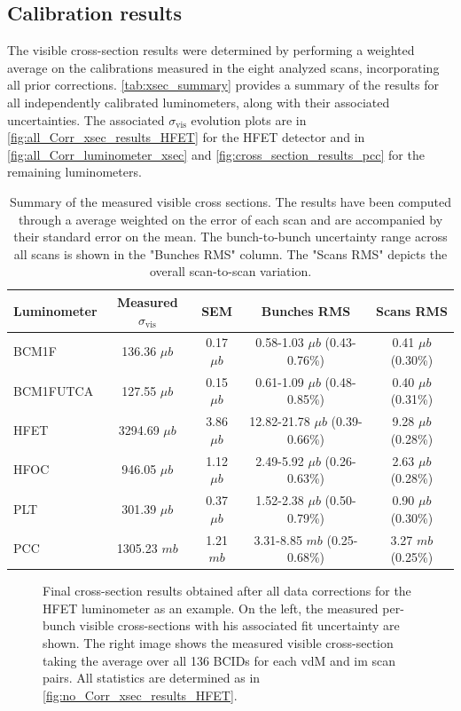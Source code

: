 \subsection{Calibration results}

The visible cross-section results were determined by performing a weighted average on the calibrations measured in the eight analyzed scans, incorporating all prior corrections. \autoref{tab:xsec_summary} provides a summary of the results for all independently calibrated luminometers, along with their associated uncertainties. The associated $\sigma_{\mathrm{vis}}$ evolution plots are in \autoref{fig:all_Corr_xsec_results_HFET} for the HFET detector and in \autoref{fig:all_Corr_luminometer_xsec} and \autoref{fig:cross_section_results_pcc} for the remaining luminometers.

\begin{table}[!htb]
	\caption{
		Summary of the measured visible cross sections. The results have been computed through a average weighted on the error of each scan and are accompanied by their standard error on the mean. The bunch-to-bunch uncertainty range across all scans is shown in the "Bunches RMS" column. The "Scans RMS" depicts the overall scan-to-scan variation. 
	}
	
	\label{tab:xsec_summary}
	\centering
	\begin{tabular}{lcccc}
		\hline
		Luminometer & Measured $\sigma_\mathrm{vis}$ & SEM  & Bunches RMS & Scans RMS \\
		\hline
		BCM1F & 136.36 $\mu b$ & 0.17 $\mu b$ & 0.58-1.03 $\mu b$ (0.43-0.76\%) & 0.41 $\mu b$ (0.30\%) \\
		BCM1FUTCA & 127.55 $\mu b$ & 0.15 $\mu b$ & 0.61-1.09 $\mu b$ (0.48-0.85\%) & 0.40 $\mu b$ (0.31\%) \\
		HFET & 3294.69 $\mu b$ & 3.86 $\mu b$ & 12.82-21.78 $\mu b$ (0.39-0.66\%) & 9.28 $\mu b$ (0.28\%) \\
		HFOC & 946.05 $\mu b$ & 1.12 $\mu b$ & 2.49-5.92 $\mu b$ (0.26-0.63\%) & 2.63 $\mu b$ (0.28\%) \\
		PLT & 301.39 $\mu b$ & 0.37 $\mu b$ & 1.52-2.38 $\mu b$ (0.50-0.79\%) & 0.90 $\mu b$ (0.30\%) \\
		PCC & 1305.23 $mb$ & 1.21 $mb$ & 3.31-8.85 $mb$ (0.25-0.68\%) & 3.27 $mb$ (0.25\%) \\
		\hline
	\end{tabular}
\end{table}

\begin{figure}[!htb]
	\centering
	\caption{Final cross-section results obtained after all data corrections for the HFET luminometer as an example. On the left, the measured per-bunch visible cross-sections with his associated fit uncertainty are shown. The right image shows the measured visible cross-section taking the average over all 136 BCIDs for each vdM and im scan pairs. All statistics are determined as in \autoref{fig:no_Corr_xsec_results_HFET}.}
	\label{fig:all_Corr_xsec_results_HFET}
\end{figure}

